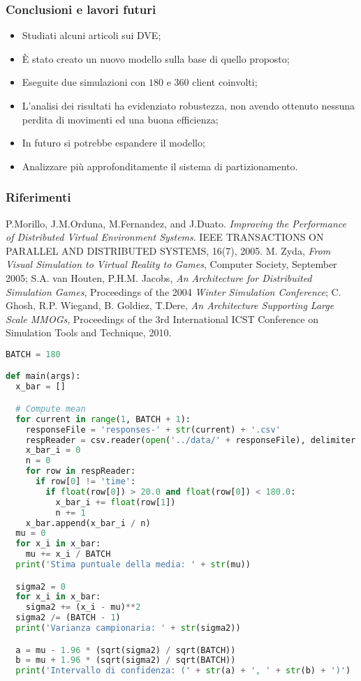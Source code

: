 \begin{frame}
\frametitle{Conclusioni e lavori futuri}
\begin{itemize}[<+->]
\item
Studiati alcuni articoli sui DVE;
\item
\`E stato creato un nuovo modello sulla base di quello proposto;
\item
Eseguite due simulazioni con $180$ e $360$ client coinvolti;
\item
L'analisi dei risultati ha evidenziato robustezza, non avendo
ottenuto nessuna perdita di movimenti ed una buona efficienza;
\item
In futuro si potrebbe espandere il modello;
\item
Analizzare più approfonditamente il sistema di partizionamento.
\end{itemize}
\end{frame}

\begin{frame}
\frametitle{Riferimenti}
\begin{thebibliography}{}
P.Morillo, J.M.Orduna, M.Fernandez, and J.Duato.
\emph{Improving the Performance of Distributed Virtual Environment
  Systems}.
IEEE TRANSACTIONS ON PARALLEL AND DISTRIBUTED SYSTEMS, 16(7),
  2005.
 M. Zyda, \emph{From Visual Simulation to Virtual Reality to
Games}, Computer Society, September 2005;
 S.A. van Houten, P.H.M. Jacobs, \emph{An Architecture for
Distribuited Simulation Games},
Proceedings of the 2004 \emph{Winter Simulation Conference};
 C. Ghosh, R.P. Wiegand, B. Goldiez, T.Dere, \emph{An
Architecture Supporting Large Scale MMOGs},
Proceedings of the 3rd International ICST Conference on Simulation Tools
and Technique, 2010.
\end{thebibliography}
\end{frame}



\appendix
\begin{frame}[fragile]
\begin{lstlisting}[language = python]
BATCH = 180

def main(args):
  x_bar = []

  # Compute mean
  for current in range(1, BATCH + 1):
    responseFile = 'responses-' + str(current) + '.csv'
    respReader = csv.reader(open('../data/' + responseFile), delimiter = ',')
    x_bar_i = 0
    n = 0
    for row in respReader:
      if row[0] != 'time':
        if float(row[0]) > 20.0 and float(row[0]) < 180.0:
          x_bar_i += float(row[1])
          n += 1
    x_bar.append(x_bar_i / n)
  mu = 0
  for x_i in x_bar:
    mu += x_i / BATCH
  print('Stima puntuale della media: ' + str(mu))

  sigma2 = 0
  for x_i in x_bar:
    sigma2 += (x_i - mu)**2
  sigma2 /= (BATCH - 1)
  print('Varianza campionaria: ' + str(sigma2))

  a = mu - 1.96 * (sqrt(sigma2) / sqrt(BATCH))
  b = mu + 1.96 * (sqrt(sigma2) / sqrt(BATCH))
  print('Intervallo di confidenza: (' + str(a) + ', ' + str(b) + ')')
\end{lstlisting}
\end{frame}
